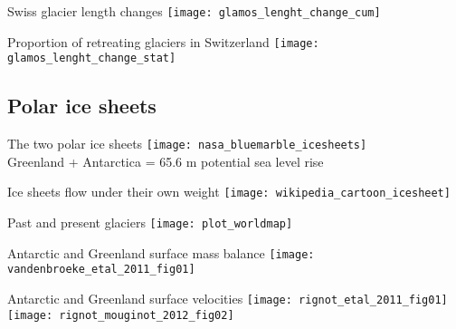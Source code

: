 
    \begin{frame}{Swiss glacier length changes}
      \centering
      \texttt{[image: glamos\_lenght\_change\_cum]}
    \end{frame}

    \begin{frame}{Proportion of retreating glaciers in Switzerland}
      \centering
      \texttt{[image: glamos\_lenght\_change\_stat]}
    \end{frame}

\subsection{Polar ice sheets}

    \begin{frame}{The two polar ice sheets}
      \centering
      \texttt{[image: nasa\_bluemarble\_icesheets]}\\
      Greenland + Antarctica = 65.6 m potential sea level rise
    \end{frame}

    \begin{frame}{Ice sheets flow under their own weight}
      \centering
      \texttt{[image: wikipedia\_cartoon\_icesheet]}
    \end{frame}

    \begin{frame}{Past and present glaciers}
      \centering
      \texttt{[image: plot\_worldmap]}
    \end{frame}

    \begin{frame}{Antarctic and Greenland surface mass balance}
      \centering
      \texttt{[image: vandenbroeke\_etal\_2011\_fig01]}
    \end{frame}

    \begin{frame}{Antarctic and Greenland surface velocities}
      \centering
      \texttt{[image: rignot\_etal\_2011\_fig01]}
      \hspace{1cm}
      \texttt{[image: rignot\_mouginot\_2012\_fig02]}
    \end{frame}
